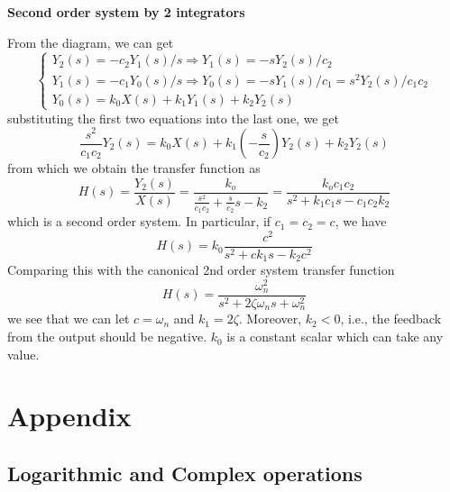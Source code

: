 \documentclass{article}
\begin{document}
{\bf Second order system by 2 integrators}


From the diagram, we can get
\begin{equation}
\left\{ \begin{array}{ll}
	Y_2(s)=-c_2Y_1(s)/s  \Longrightarrow  Y_1(s)=-sY_2(s)/c_2 \\
	Y_1(s)=-c_1Y_0(s)/s  \Longrightarrow Y_0(s)=-sY_1(s)/c_1=s^2Y_2(s)/c_1c_2 \\
	Y_0(s)=k_0 X(s)+k_1Y_1(s)+k_2Y_2(s) 
	\end{array} \right.
\end{equation}
substituting the first two equations into the last one, we get
\begin{equation}	\frac{s^2}{c_1c_2} Y_2(s)=k_0X(s)+k_1(-\frac{s}{c_2})Y_2(s)+k_2Y_2(s) \end{equation}
from which we obtain the transfer function as
\begin{equation}
H(s)=\frac{Y_2(s)}{X(s)}=\frac{k_o}{\frac{s^2}{c_1c_2}+\frac{s}{c_2}s-k_2}
	=\frac{k_oc_1c_2}{s^2+k_1c_1s-c_1c_2k_2}
\end{equation}
which is a second order system. In particular, if $c_1=c_2=c$, we have
\begin{equation}
	H(s)=k_0\frac{c^2}{s^2+c k_1s-k_2c^2}
\end{equation}
Comparing this with the canonical 2nd order system transfer function
\begin{equation}
	H(s)=\frac{\omega_n^2}{s^2+2\zeta \omega_n s+\omega_n^2}
\end{equation}
we see that we can let $c=\omega_n$ and $k_1=2\zeta$. Moreover, $k_2<0$, 
i.e., the feedback from the output should be negative. $k_0$ is a constant
scalar which can take any value.
	


\section*{Appendix}

\subsection*{Logarithmic and Complex operations}
\end{document}
